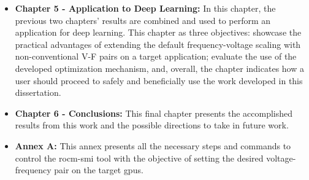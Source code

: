 \begin{itemize}
    \item \textbf{Chapter 5 - Application to Deep Learning:} In this chapter, the previous two chapters' results are combined and used to perform an application for deep learning. This chapter as three objectives: showcase the practical advantages of extending the default frequency-voltage scaling with non-conventional V-F pairs on a target application; evaluate the use of the developed optimization mechanism, and, overall, the chapter indicates how a user should proceed to safely and beneficially use the work developed in this dissertation.
    \item \textbf{Chapter 6 - Conclusions:} This final chapter presents the accomplished results from this work and the possible directions to take in future work.
    \item \textbf{Annex A:} This annex presents all the necessary steps and commands to control the rocm-smi tool with the objective of setting the desired voltage-frequency pair on the target \acrshort{gpu}s.
\end{itemize}

